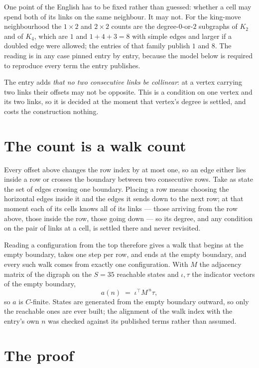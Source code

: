 \documentclass[11pt,a4paper]{article}
\theoremstyle{plain}
\theoremstyle{definition}
\begin{document}
One point of the English has to be fixed rather than guessed: whether a cell may spend both of
its links on the same neighbour. It may not. For the king-move neighbourhood the $1\times2$
and $2\times2$ counts are the degree-$0$-or-$2$ subgraphs of $K_2$ and of $K_4$, which are $1$
and $1+4+3=8$ with simple edges and larger if a doubled edge were allowed; the entries of that
family publish $1$ and $8$. The reading is in any case pinned entry by entry, because the
model below is required to reproduce every term the entry publishes.

The entry adds \emph{that no two consecutive links be collinear}: at a vertex carrying two
links their offsets may not be opposite. This is a condition on one vertex and its two links,
so it is decided at the moment that vertex's degree is settled, and costs the construction
nothing.

\section{The count is a walk count}

Every offset above changes the row index by at most one, so an edge either lies inside a row
or crosses the boundary between two consecutive rows. Take as state the set of edges crossing
one boundary. Placing a row means choosing the horizontal edges inside it and the edges it
sends down to the next row; at that moment each of its cells knows all of its links --- those
arriving from the row above, those inside the row, those going down --- so its degree, and any
condition on the pair of links at a cell, is settled there and never revisited.

Reading a configuration from the top therefore gives a walk that begins at the empty boundary,
takes one step per row, and ends at the empty boundary, and every such walk comes from exactly
one configuration. With $M$ the adjacency matrix of the digraph on the $S=35$ reachable
states and $\iota,\tau$ the indicator vectors of the empty boundary,
\[
a(n)\;=\;\iota^{\!\top}M^{\,n}\tau ,
\]
so $a$ is $C$-finite. States are generated from the empty boundary outward, so only the
reachable ones are ever built; the alignment of the walk index with the entry's own $n$ was
checked against its published terms rather than assumed.

\section{The proof}
\end{document}
